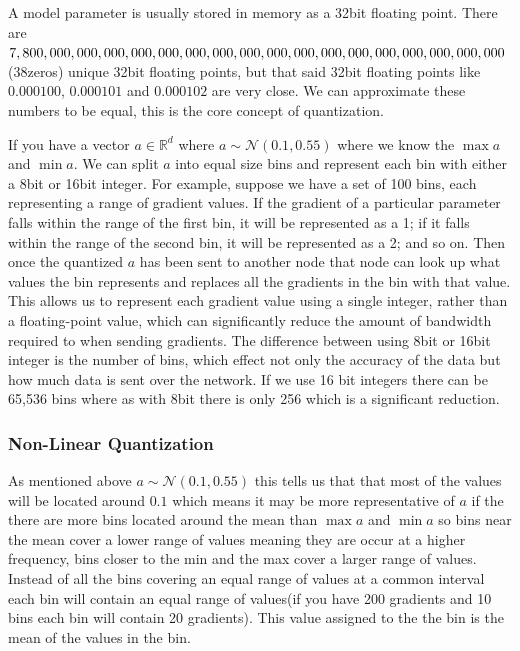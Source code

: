\documentclass[11pt]{article}
\begin{document}
A model parameter is usually stored in memory as a 32bit floating point. There are $7, 800, 000, 000,\\ 000, 000,000,000,000,000,000,000,000,000,000,000,000,000,000$(38zeros) unique 32bit floating points, but that said 32bit floating points like $0.000100$, $0.000101$ and $0.000102$ are very close. We can approximate these numbers to be equal, this is the core concept of quantization.

If you have a vector $a \in \mathbb{R}^d$ where $a \sim \mathcal{N}(0.1,0.55)$ where we know the $\max a$ and $\min a$. We can split $a$ into equal size bins and represent each bin with either a 8bit or 16bit integer. For example, suppose we have a set of 100 bins, each representing a range of gradient values. If the gradient of a particular parameter falls within the range of the first bin, it will be represented as a 1; if it falls within the range of the second bin, it will be represented as a 2; and so on. Then once the quantized $a$ has been sent to another node that node can look up what values the bin represents and replaces all the gradients in the bin with that value. This allows us to represent each gradient value using a single integer, rather than a floating-point value, which can significantly reduce the amount of bandwidth required to when sending gradients. The difference between using 8bit or 16bit integer is the number of bins, which effect not only the accuracy of the data but how much data is sent over the network. If we use 16 bit integers there can be 65,536 bins where as with 8bit there is only 256 which is a significant reduction.

\subsubsection{Non-Linear Quantization}

As mentioned above $a \sim \mathcal{N}(0.1,0.55)$ this tells us that that most of the values will be located around $0.1$ which means it may be more representative of $a$ if the there are more bins located around the mean than $\max a$ and $\min a$ so bins near the mean cover a lower range of values meaning they are occur at a higher frequency, bins closer to the min and the max cover a larger range of values. Instead of all the bins covering an equal range of values at a common interval each bin will contain an equal range of values(if you have 200 gradients and 10 bins each bin will contain 20 gradients). This value assigned to the the bin is the mean of the values in the bin.
\end{document}
